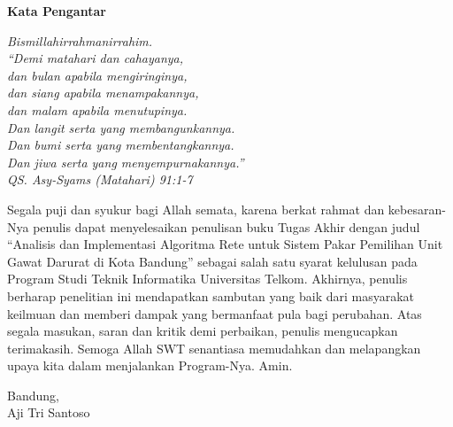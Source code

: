 {\centering
	\textbf{\large Kata Pengantar}\\
	\vspace{0.5cm}
}


\begin{center}
\textsl{	Bismillahirrahmanirrahim.\\
	“Demi matahari dan cahayanya,\\
	dan bulan apabila mengiringinya,\\
	dan siang apabila menampakannya,\\
	dan malam apabila menutupinya.\\
	Dan langit serta yang membangunkannya.\\
	Dan bumi serta yang membentangkannya.\\
	Dan jiwa serta yang menyempurnakannya.” \\
	QS. Asy-Syams (Matahari) 91:1-7 }

\end{center}

Segala puji dan syukur bagi Allah semata, karena berkat rahmat dan kebesaran-Nya penulis dapat menyelesaikan penulisan buku Tugas Akhir dengan judul “Analisis dan Implementasi Algoritma Rete untuk Sistem Pakar Pemilihan Unit Gawat Darurat di Kota Bandung” sebagai salah satu syarat kelulusan pada Program Studi Teknik Informatika Universitas Telkom.
Akhirnya, penulis berharap penelitian ini mendapatkan sambutan yang baik dari masyarakat keilmuan dan memberi dampak yang bermanfaat pula bagi perubahan. Atas segala masukan, saran dan kritik demi perbaikan, penulis mengucapkan terimakasih.
Semoga Allah SWT senantiasa memudahkan dan melapangkan upaya kita dalam menjalankan Program-Nya. Amin.
\vspace{1.25 cm}
\begin{flushright}
	{Bandung, \Tanggal\quad \Bulan \quad \Date}\\
	\vspace{1.25 cm}
	Aji Tri Santoso\\
	
\end{flushright}
